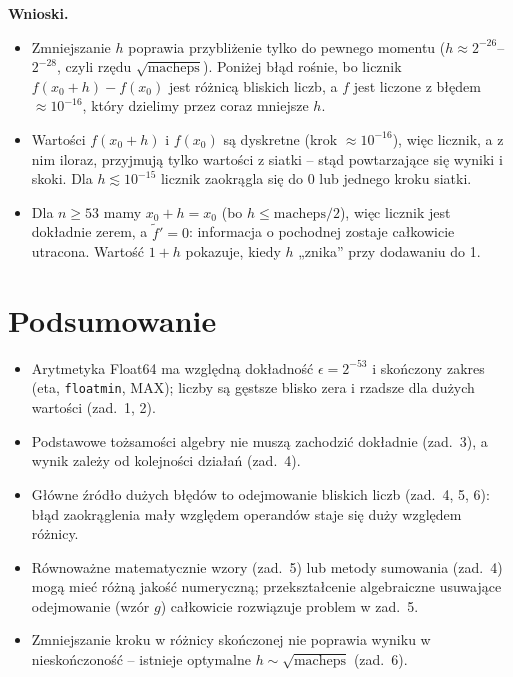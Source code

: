 \documentclass[11pt,a4paper]{article}
\begin{document}
\textbf{Wnioski.}
\begin{itemize}
\item Zmniejszanie $h$ poprawia przybliżenie tylko do pewnego momentu ($h\approx2^{-26}$--$2^{-28}$, czyli rzędu $\sqrt{\text{macheps}}$). Poniżej błąd rośnie, bo licznik $f(x_0+h)-f(x_0)$ jest różnicą bliskich liczb, a $f$ jest liczone z błędem $\approx10^{-16}$, który dzielimy przez coraz mniejsze $h$.
\item Wartości $f(x_0+h)$ i $f(x_0)$ są dyskretne (krok $\approx10^{-16}$), więc licznik, a z nim iloraz, przyjmują tylko wartości z siatki -- stąd powtarzające się wyniki i skoki. Dla $h\lesssim10^{-15}$ licznik zaokrągla się do $0$ lub jednego kroku siatki.
\item Dla $n\ge53$ mamy $x_0+h=x_0$ (bo $h\le\text{macheps}/2$), więc licznik jest dokładnie zerem, a $\tilde f'=0$: informacja o pochodnej zostaje całkowicie utracona. Wartość $1+h$ pokazuje, kiedy $h$ „znika'' przy dodawaniu do 1.
\end{itemize}

\section{Podsumowanie}
\begin{itemize}
\item Arytmetyka Float64 ma względną dokładność $\epsilon=2^{-53}$ i skończony zakres (eta, \texttt{floatmin}, MAX); liczby są gęstsze blisko zera i rzadsze dla dużych wartości (zad.~1, 2).
\item Podstawowe tożsamości algebry nie muszą zachodzić dokładnie (zad.~3), a wynik zależy od kolejności działań (zad.~4).
\item Główne źródło dużych błędów to odejmowanie bliskich liczb (zad.~4, 5, 6): błąd zaokrąglenia mały względem operandów staje się duży względem różnicy.
\item Równoważne matematycznie wzory (zad.~5) lub metody sumowania (zad.~4) mogą mieć różną jakość numeryczną; przekształcenie algebraiczne usuwające odejmowanie (wzór $g$) całkowicie rozwiązuje problem w zad.~5.
\item Zmniejszanie kroku w różnicy skończonej nie poprawia wyniku w nieskończoność -- istnieje optymalne $h\sim\sqrt{\text{macheps}}$ (zad.~6).
\end{itemize}
\end{document}
